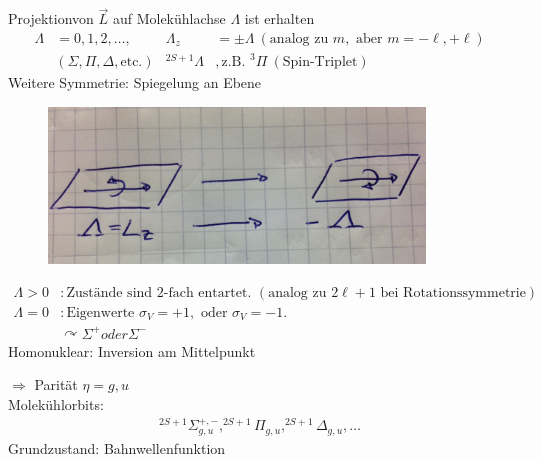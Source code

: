Projektionvon $\vec{L}$ auf Molekühlachse $\Lambda$ ist erhalten
	\begin{align*}
		\Lambda &= 0, 1, 2, \ldots ,&
		\Lambda_z &= \pm \Lambda ~(\text{analog zu } m, \text{ aber } m = -\ell, +\ell) \\
		&\left(\Sigma, \Pi, \Delta, \text{etc.}\right)
		& ^{2S + 1}\Lambda &, \text{z.B. } ^3 \Pi ~(\text{Spin-Triplet}) 
	\end{align*}
Weitere Symmetrie: Spiegelung an Ebene
	\begin{figure} [h]
		\begin{center}
			\includegraphics[width=10cm]{Homonukleare_Molekuele2}
		\end{center}
	\end{figure}
	\begin{align*}
		\Lambda > 0 &: \text{Zustände sind 2-fach entartet. } (\text{analog zu } 2 \ell + 1 \text{ bei Rotationssymmetrie}) \\
		\Lambda = 0 &: \text{Eigenwerte } \sigma_V = + 1, \text{ oder } \sigma_V = -1.\\
		&\curvearrowright \Sigma^+ oder \Sigma^-
	\end{align*}
Homonuklear: Inversion am Mittelpunkt
	
$\Rightarrow$ Parität $\eta = g, u$ 
\\
Molekühlorbits:
	\begin{align*}
		^{2 S + 1}\Sigma_{g, u}^{+ , -} , ^{2 S + 1} \Pi_{g, u}, ^{2 S + 1}\Delta_{g, u}, \ldots
	\end{align*}
Grundzustand: Bahnwellenfunktion 

